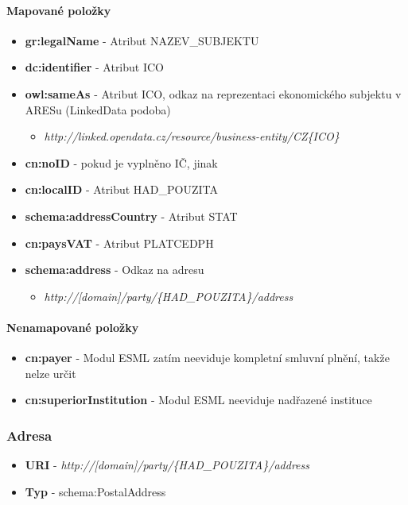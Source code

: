 \paragraph*{Mapované položky}
\begin{itemize}
\item \textbf{gr:legalName} - Atribut NAZEV\_SUBJEKTU
\item \textbf{dc:identifier} - Atribut ICO
\item \textbf{owl:sameAs} - Atribut ICO, odkaz na reprezentaci ekonomického subjektu v ARESu (LinkedData podoba)
	\begin{itemize}
	\item \textit{http://linked.opendata.cz/resource/business-entity/CZ\{ICO\}}
	\end{itemize}
\item \textbf{cn:noID} -  pokud je vyplněno IČ, jinak 
\item \textbf{cn:localID} - Atribut HAD\_POUZITA
\item \textbf{schema:addressCountry} - Atribut STAT
\item \textbf{cn:paysVAT} - Atribut PLATCEDPH
\item \textbf{schema:address} - Odkaz na adresu
	\begin{itemize}
	\item \textit{http://[domain]/party/\{HAD\_POUZITA\}/address}
	\end{itemize}
\end{itemize}

\paragraph*{Nenamapované položky}
\begin{itemize}
\item \textbf{cn:payer} - Modul ESML zatím neeviduje kompletní smluvní plnění, takže nelze určit 
\item \textbf{cn:superiorInstitution} - Modul ESML neeviduje nadřazené instituce
\end{itemize}

\subsubsection{Adresa}

\begin{itemize}
\item \textbf{URI} - \textit{http://[domain]/party/\{HAD\_POUZITA\}/address}
\item \textbf{Typ} - schema:PostalAddress
\end{itemize}

